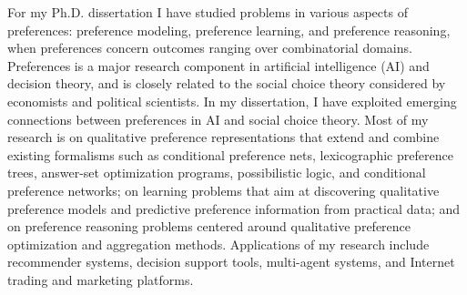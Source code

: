 For my Ph.D. dissertation I have studied problems in various aspects of preferences:
preference modeling, preference learning, and preference reasoning, 
when preferences concern outcomes ranging over combinatorial domains.
Preferences is a major research component
in artificial intelligence (AI) and decision theory, and is closely related to the 
social choice theory considered by economists and political scientists. 
In my dissertation, I have exploited emerging connections between 
preferences in AI and social choice theory. 
Most of my research is on qualitative preference representations that extend and combine
existing formalisms such as conditional preference nets, 
lexicographic preference trees, answer-set optimization programs,
possibilistic logic, and conditional preference networks; on 
learning problems that aim at discovering qualitative preference models and 
predictive preference information from practical data; and on
preference reasoning problems centered around qualitative preference optimization 
and aggregation methods.
Applications of my
research include recommender systems, decision support tools, multi-agent systems,
and Internet trading and marketing platforms.
